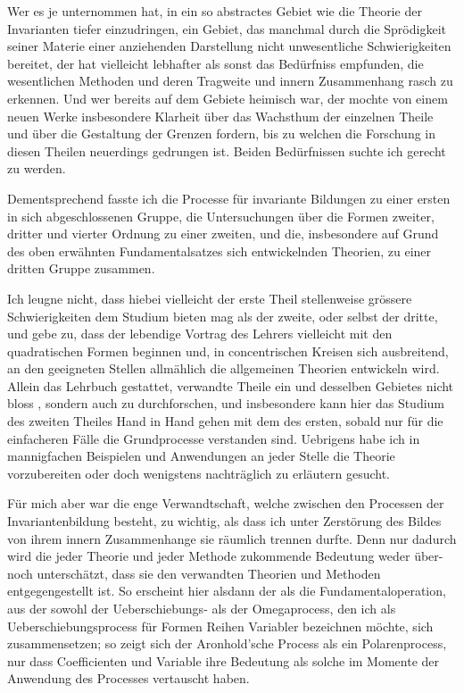 \documentclass[11pt]{article}
\providecommand{\gesperrt}[1]{\textls[130]{#1}}
\begin{document}
Wer es je unternommen hat, in ein so abstractes Gebiet wie die Theorie der Invarianten tiefer einzudringen, ein Gebiet, das manchmal durch die Sprödigkeit seiner Materie einer anziehenden Darstellung nicht unwesentliche Schwierigkeiten bereitet, der hat vielleicht lebhafter als sonst das Bedürfniss empfunden, die wesentlichen Methoden und deren Tragweite und innern Zusammenhang rasch zu erkennen. Und wer bereits auf dem Gebiete heimisch war, der mochte von einem neuen Werke insbesondere Klarheit über das Wachsthum der einzelnen Theile und über die Gestaltung der Grenzen fordern, bis zu welchen die Forschung in diesen Theilen neuerdings gedrungen ist. Beiden Bedürfnissen suchte ich gerecht zu werden.

Dementsprechend fasste ich die Processe für invariante Bildungen zu einer ersten in sich abgeschlossenen Gruppe, die Untersuchungen über die Formen zweiter, dritter und vierter Ordnung zu einer zweiten, und die, insbesondere auf Grund des oben erwähnten Fundamentalsatzes sich entwickelnden Theorien, zu einer dritten Gruppe zusammen.

Ich leugne nicht, dass hiebei vielleicht der erste Theil stellenweise grössere Schwierigkeiten dem Studium bieten mag als der zweite, oder selbst der dritte, und gebe zu, dass der lebendige Vortrag des Lehrers vielleicht mit den quadratischen Formen beginnen und, in concentrischen Kreisen sich ausbreitend, an den geeigneten Stellen
allmählich die allgemeinen Theorien entwickeln wird. Allein das Lehrbuch gestattet, verwandte Theile ein und desselben Gebietes nicht bloss \gesperrt{nach einander}, sondern auch \gesperrt{neben einander} zu durchforschen, und insbesondere kann hier das Studium des zweiten Theiles Hand in Hand gehen mit dem des ersten, sobald nur für die einfacheren Fälle die Grundprocesse verstanden sind. Uebrigens habe ich in mannigfachen Beispielen und Anwendungen an jeder Stelle die Theorie vorzubereiten oder doch wenigstens nachträglich zu erläutern gesucht.

Für mich aber war die enge Verwandtschaft, welche zwischen den Processen der Invariantenbildung besteht, zu wichtig, als dass ich unter Zerstörung des Bildes von ihrem innern Zusammenhange sie räumlich trennen durfte. Denn nur dadurch wird die jeder Theorie und jeder Methode zukommende Bedeutung weder über- noch unterschätzt, dass sie den verwandten Theorien und Methoden entgegengestellt ist. So erscheint hier alsdann der \gesperrt{Faltungsprocess} als die Fundamentaloperation, aus der sowohl der Ueberschiebungs- als der Omegaprocess, den ich als Ueberschiebungsprocess für Formen \gesperrt{mehrerer} Reihen Variabler bezeichnen möchte, sich zusammensetzen; so zeigt sich der Aronhold'sche Process als ein Polarenprocess, nur dass Coefficienten und Variable ihre Bedeutung als solche im Momente der Anwendung des Processes vertauscht haben.
\end{document}
